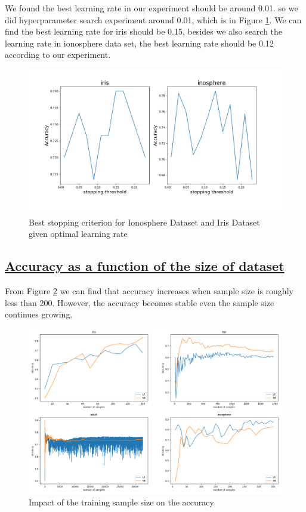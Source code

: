 \documentclass[11pt]{scrartcl}
\begin{document}
We found the best learning rate in our experiment should be around 0.01. so we did hyperparameter search experiment around 0.01, which is in Figure \ref{stopping_cri_lr}. We can find the best learning rate for iris should be 0.15, besides we also search the learning rate in ionosphere data set, the best learning rate should be 0.12 according to our experiment.


\begin{figure}[htbp]
	\centering
	\includegraphics[width=0.8\linewidth]{fig/stopping-threshold.png}
	\caption{Best stopping criterion for Ionosphere Dataset and Iris Dataset given optimal learning rate}
	\label{stopping_cri_lr}
\end{figure}

\subsection*{\underline{Accuracy as a function of the size of dataset}}

From Figure \ref{size_accuracy} we can find that accuracy increases when sample size is roughly less than 200. However, the accuracy becomes stable even the sample size continues growing. 

\begin{figure}[htbp]
	\centering
	\includegraphics[width=0.8\linewidth]{fig/dataset_size.png}
	\caption{Impact of the training sample size on the accuracy}
	\label{size_accuracy}
\end{figure}
\end{document}
